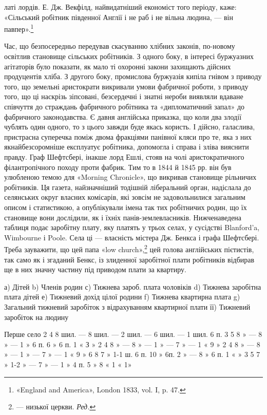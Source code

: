 латі лордів. Е. Дж. Векфілд, найвидатніший економіст того періоду,
каже: «Сільський робітник південної Англії і не раб
і не вільна людина, — він павпер».\footnote{
«England and America», London 1833, vol. I, p. 47.
}

Час, що безпосередньо передував скасуванню хлібних законів,
по-новому освітлив становище сільських робітників. З одного
боку, в інтересі буржуазних агітаторів було показати, як
мало ті охоронні закони захищають дійсних продуцентів хліба.
З другого боку, промислова буржуазія кипіла гнівом з приводу
того, що земельні аристократи викривали умови фабричної роботи,
з приводу того, що ці наскрізь зіпсовані, безсердечні і
знатні нероби виявляли вдаване співчуття до страждань фабричного
робітника та «дипломатичний запал» до фабричного законодавства.
Є давня англійська приказка, що коли два злодії
чублять один одного, то з цього завжди буде якась користь.
І дійсно, галаслива, пристрасна суперечка поміж двома фракціями
панівної кляси про те, яка з них якнайбезсоромніше експлуатує
робітника, допомогла і справа і зліва вияснити правду. Граф
Шефтсбері, інакше лорд Ешлі, стояв на чолі аристократичного
філантропічного походу проти фабрик. Тим то в 1844 й
1845 рр. він був улюбленою темою для «Morning Chronicle», що
викривав становище рільничих робітників. Ця газета, найзначніший
тодішній ліберальний орган, надіслала до селянських округ
власних комісарів, які зовсім не задовольнилися загальним
описом і статистикою, а опублікували імена так тих робітничих
родин, що їх становище вони дослідили, як і їхніх панів-землевласників.
Нижченаведена таблиця подає заробітну плату,
яку платять у трьох селах, у сусідстві Blanford’a, Wimbourne
і Poole. Села ці — власність містера Дж. Бенкса і графа Шефтсбері.
Треба зауважити, що цей папа «low church»,\footnote*{
— низької церкви. \emph{Ред.}
} цей голова англійських
пієтистів, так само як і згаданий Бенкс, із злиденної
заробітної плати робітників відбирав ще в них значну частину
під приводом плати за квартиру.

а) Дітей    b) Членів родин    с) Тижнева зароб. плата чоловіків    d) Тижнева заробітна плата дітей
   е) Тижневий дохід цілої родини    f) Тижнева квартирна плата
g) Загальний тижневий заробіток з відрахуванням квартирної плати    її) Тижневий заробіток на людину

Перше село
2    4    8 шил. —                8 шил. —     2 шил. —       6 шил.   —     1 шил. 6      п.
3    5    8    »     —                 8   »      —     1    »      6 п.   6    »       6 п.  1   « 
    З  »
2    4    8    »     —                 8   »      —     1    »      —      7    »       —      1   «
     9       »
2    4    8    »     —                 8   »      —     1    »      —      7    »       —      1   «
     9       »
6    8    7    »    1-1 ш. 6 п.  10 »      6п.   2    »     —       8    »       6 п.   1  «        
 »
3    5    7    »    1-2  » —       7   »      —     1    »      4 п.   5    »       8 «     1  «    
 1»